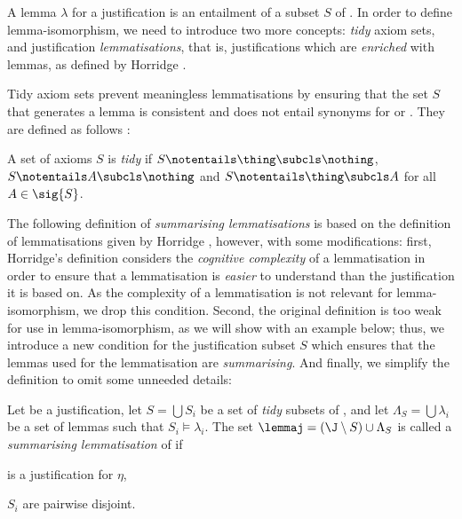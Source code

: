 A lemma $\lambda$ for a justification \J is an entailment of a subset $S$ of \J. In order to define lemma-isomorphism, we need to introduce two more concepts: \emph{tidy} axiom sets, and justification \emph{lemmatisations}, that is, justifications which are \emph{enriched} with lemmas, as defined by Horridge  \cite{horridge11ab}. 

Tidy axiom sets prevent meaningless lemmatisations by ensuring that the set $S$ that generates a lemma is consistent and does not entail synonyms for \thing or \nothing. They are defined as follows \cite[p 252]{horridge11ab}:
\begin{defn}
A set of axioms $S$ is \emph{tidy} if $S \notentails \thing \subcls \nothing$, $S \notentails A \subcls \nothing$ and $S \notentails \thing \subcls A$ for all $A \in \sig{S}$.
\end{defn}
The following definition of \emph{summarising lemmatisations} is based on the definition of lemmatisations given by Horridge \cite[p 253]{horridge11ab}, however, with some modifications: first, Horridge's definition considers the \emph{cognitive complexity} of a lemmatisation in order to ensure that a lemmatisation is \emph{easier} to understand than the justification it is based on. As the complexity of a lemmatisation is not relevant for lemma-isomorphism, we drop this condition. Second, the original definition is too weak for use in lemma-isomorphism, as we will show with an example below; thus, we introduce a new condition for the justification subset $S$ which ensures that the lemmas used for the lemmatisation are \emph{summarising}. And finally, we simplify the definition to omit some unneeded details:
\begin{defn}
Let \justeta be a justification, let $S = \bigcup S_{i}$ be a set of \emph{tidy} subsets of \J, and let $\Lambda_{S} = \bigcup \lambda_{i}$ be a set of lemmas such that $S_{i} \models \lambda_{i}$. The set $\lemmaj = (\J \setminus S) \cup \Lambda_{S}$ is called a \emph{summarising lemmatisation} of \J if 
\begin{compactenum}
\item \lemmaj is a justification for $\eta$,
\item $S_{i}$ are pairwise disjoint.
\end{compactenum}
\end{defn}

